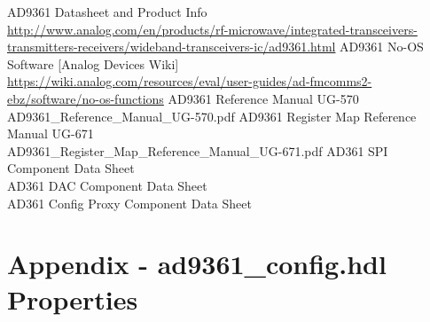 \documentclass{article}
\def\comp{ad9361\_config}
\begin{document}
\begin{thebibliography}{1}

 AD9361 Datasheet and Product Info \\
\url{http://www.analog.com/en/products/rf-microwave/integrated-transceivers-transmitters-receivers/wideband-transceivers-ic/ad9361.html}
 AD9361 No-OS Software [Analog Devices Wiki]\\
\url{https://wiki.analog.com/resources/eval/user-guides/ad-fmcomms2-ebz/software/no-os-functions}
 AD9361 Reference Manual UG-570\\
AD9361\_Reference\_Manual\_UG-570.pdf
 AD9361 Register Map Reference Manual UG-671\\
AD9361\_Register\_Map\_Reference\_Manual\_UG-671.pdf
 AD361 SPI Component Data Sheet \\
 AD361 DAC Component Data Sheet \\
 AD361 Config Proxy Component Data Sheet \\

\end{thebibliography}
\pagebreak
\landscape
\section{Appendix - \comp{}.hdl Properties}
\label{appendix:properties}
\begin{scriptsize}

\end{scriptsize}
\pagebreak
\end{document}
